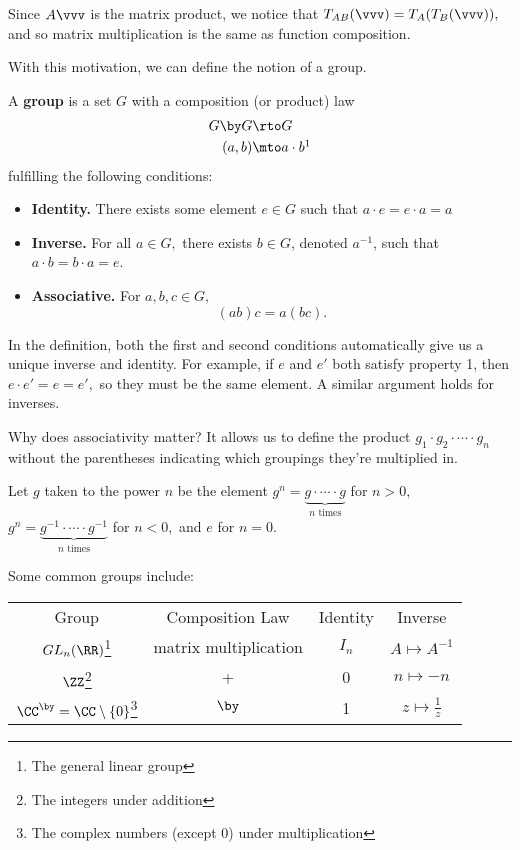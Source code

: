 Since $A\vvv$ is the matrix product, we notice that $T_{AB}(\vvv) = T_A(T_B(\vvv)),$ and so matrix multiplication is the same as function composition.

With this motivation, we can define the notion of a group.
\begin{definition}[Group]
A \textbf{group} is a set $G$ with a composition (or product) law
\begin{align*}
    G \by G &\rto G \\
    (a, b) &\mto a\cdot b\footnotemark %
\end{align*}
fulfilling the following conditions:
\begin{itemize}
    \item \textbf{Identity.} There exists some element $e \in G$ such that $a \cdot e = e \cdot a = a$
    \item \textbf{Inverse.} For all $a \in G,$ there exists $b \in G$, denoted $a^{-1}$, such that $a \cdot b = b \cdot a = e$.

    \item \textbf{Associative.} For $a, b, c \in G,$
    \[
    (ab)c = a(bc).
    \]
\end{itemize}
\end{definition}
In the definition, both the first and second conditions automatically give us a unique inverse and identity. For example, if $e$ and $e'$ both satisfy property 1, then $e\cdot e' = e = e',$ so they must be the same element. A similar argument holds for inverses.

Why does associativity matter? It allows us to define the product $g_1 \cdot g_2\cdot  \cdots \cdot g_n$ without the parentheses indicating which groupings they're multiplied in.

\begin{definition}
Let $g$ taken to the power $n$ be the element $g^n = \underbrace{g\cdot \cdots \cdot g}_{n \text{ times}}$ for $n > 0,$ $g^n = \underbrace{g^{-1}\cdot \cdots \cdot g^{-1}}_{n \text{ times}}$ for $n < 0,$ and $e$ for $n = 0.$
\end{definition}

\begin{example}
Some common groups include:

\begin{center}
\begin{tabular}{ c c c c }
 Group & Composition Law & Identity & Inverse \\
 $GL_n(\RR)$\footnote{The general linear group} & matrix multiplication & $I_n$ & $A \mapsto A^{-1}$ \\
 $\ZZ$\footnote{The integers under addition} & + & 0 & $n \mapsto -n$ \\
 $\CC^{\by} = \CC\setminus \{0\}$\footnote{The complex numbers (except 0) under multiplication} & $\by$ & 1 & $z \mapsto \frac{1}{z}$
\end{tabular}
\end{center}

\end{example}

